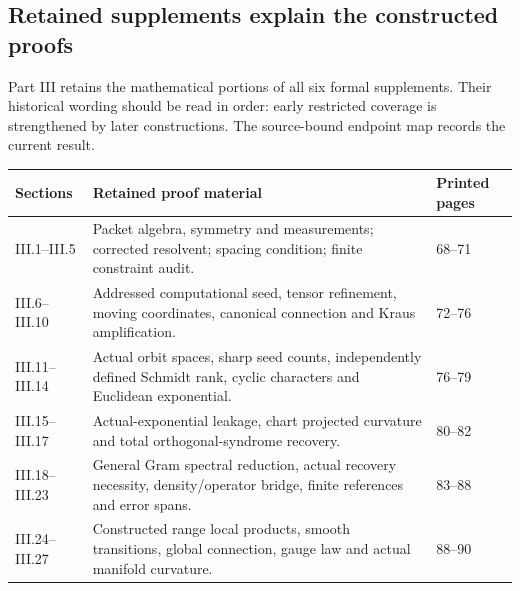 \subsection{Retained supplements explain the constructed proofs}
Part III retains the mathematical portions of all six formal supplements. Their historical wording should be read in order: early restricted coverage is strengthened by later constructions. The source-bound endpoint map records the current result.
\begin{longtable}{@{}p{.17\linewidth}p{.60\linewidth}p{.16\linewidth}@{}}\toprule Sections & Retained proof material & Printed pages\\\midrule\endhead
III.1–III.5 & Packet algebra, symmetry and measurements; corrected resolvent; spacing condition; finite constraint audit. & 68–71\\
III.6–III.10 & Addressed computational seed, tensor refinement, moving coordinates, canonical connection and Kraus amplification. & 72–76\\
III.11–III.14 & Actual orbit spaces, sharp seed counts, independently defined Schmidt rank, cyclic characters and Euclidean exponential. & 76–79\\
III.15–III.17 & Actual-exponential leakage, chart projected curvature and total orthogonal-syndrome recovery. & 80–82\\
III.18–III.23 & General Gram spectral reduction, actual recovery necessity, density/operator bridge, finite references and error spans. & 83–88\\
III.24–III.27 & Constructed range local products, smooth transitions, global connection, gauge law and actual manifold curvature. & 88–90\\
\bottomrule\end{longtable}
